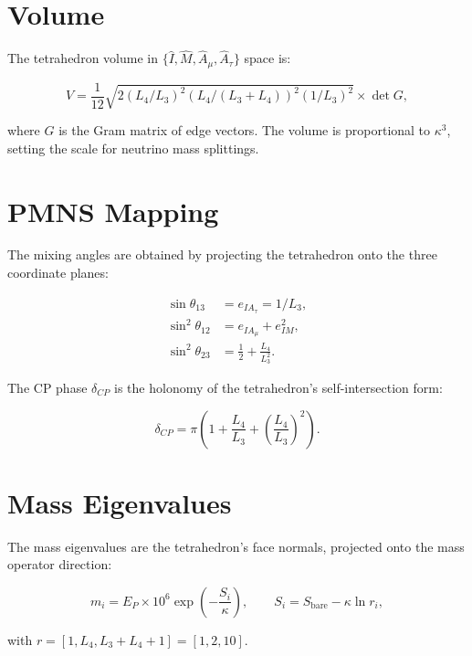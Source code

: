 \section{Volume}

The tetrahedron volume in $\{\hat I, \hat M, \hat A_\mu, \hat A_\tau\}$
space is:

\[
V = \frac{1}{12}\sqrt{2(L_4/L_3)^2(L_4/(L_3+L_4))^2(1/L_3)^2}
  \times \det G,
\]

where $G$ is the Gram matrix of edge vectors.  The volume is proportional
to $\kappa^3$, setting the scale for neutrino mass splittings.

\section{PMNS Mapping}

The mixing angles are obtained by projecting the tetrahedron onto the
three coordinate planes:

\[
\begin{aligned}
\sin\theta_{13} &= e_{IA_\tau} = 1/L_3, \\[4pt]
\sin^2\theta_{12} &= e_{IA_\mu} + e_{IM}^2, \\[4pt]
\sin^2\theta_{23} &= \frac12 + \frac{L_4}{L_3^2}.
\end{aligned}
\]

The CP phase $\delta_{CP}$ is the holonomy of the tetrahedron's
self-intersection form:

\[
\delta_{CP} = \pi\left(1 + \frac{L_4}{L_3} + \left(\frac{L_4}{L_3}\right)^2\right).
\]

\section{Mass Eigenvalues}

The mass eigenvalues are the tetrahedron's face normals, projected onto
the mass operator direction:

\[
m_i = E_P \times 10^6 \exp\left(-\frac{S_i}{\kappa}\right),
\qquad
S_i = S_{\text{bare}} - \kappa \ln r_i,
\]

with $r = [1, L_4, L_3+L_4+1] = [1, 2, 10]$.
